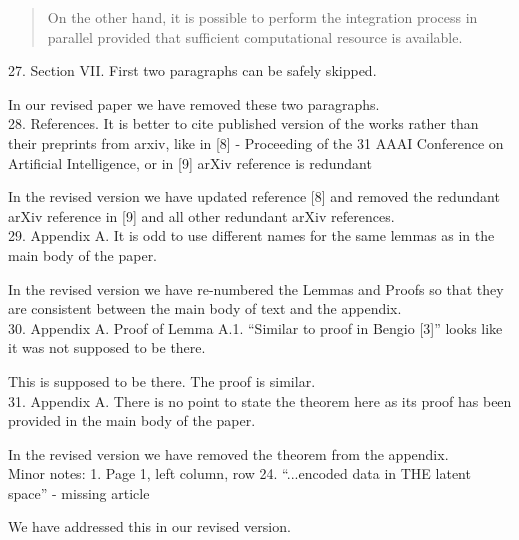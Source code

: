 \documentclass[a4paper,11pt]{article}
\begin{document}
\begin{quote}
 On the other hand, it is possible to perform the integration process in parallel provided that sufficient computational resource is available.
\end{quote}

{\color{blue}
27. Section VII. First two paragraphs can be safely skipped.\\
}

In our revised paper we have removed these two paragraphs.\\

{\color{blue}
28. References. It is better to cite published version of the works rather than their preprints from arxiv, like in [8] - Proceeding of the 31 AAAI Conference on Artificial Intelligence, or in [9] arXiv reference is redundant\\
}

In the revised version we have updated reference [8] and removed the redundant arXiv reference in [9] and all other redundant arXiv references.\\

{\color{blue}
29. Appendix A. It is odd to use different names for the same lemmas as in the main body of the paper.\\
}

In the revised version we have re-numbered the Lemmas and Proofs so that they are consistent between the main body of text and the appendix.\\

{\color{blue}
30. Appendix A. Proof of Lemma A.1. ``Similar to proof in Bengio [3]'' looks like it was not supposed to be there.\\
}

This is supposed to be there. The proof is similar.\\

{\color{blue}
31. Appendix A. There is no point to state the theorem here as its proof has been provided in the main body of the paper. \\
}

In the revised version we have removed the theorem from the appendix.\\

{\color{blue}
Minor notes:
1. Page 1, left column, row 24. ``...encoded data in THE latent space'' - missing article\\
}

We have addressed this in our revised version.\\ 
\end{document}
